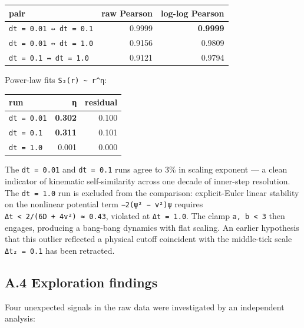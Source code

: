 \documentclass[
]{article}
\begin{document}
\begin{longtable}[]{@{}lrr@{}}
\toprule\noalign{}
pair & raw Pearson & log-log Pearson \\
\midrule\noalign{}
\endhead
\bottomrule\noalign{}
\endlastfoot
\texttt{dt\ =\ 0.01\ ↔\ dt\ =\ 0.1} & 0.9999 & \textbf{0.9999} \\
\texttt{dt\ =\ 0.01\ ↔\ dt\ =\ 1.0} & 0.9156 & 0.9809 \\
\texttt{dt\ =\ 0.1\ ↔\ dt\ =\ 1.0} & 0.9121 & 0.9794 \\
\end{longtable}

Power-law fits \texttt{S₂(r)\ \textasciitilde{}\ r\^{}η}:

\begin{longtable}[]{@{}lrr@{}}
\toprule\noalign{}
run & η & residual \\
\midrule\noalign{}
\endhead
\bottomrule\noalign{}
\endlastfoot
\texttt{dt\ =\ 0.01} & \textbf{0.302} & 0.100 \\
\texttt{dt\ =\ 0.1} & \textbf{0.311} & 0.101 \\
\texttt{dt\ =\ 1.0} & 0.001 & 0.000 \\
\end{longtable}

The \texttt{dt\ =\ 0.01} and \texttt{dt\ =\ 0.1} runs agree to 3\% in
scaling exponent --- a clean indicator of kinematic self-similarity
across one decade of inner-step resolution. The \texttt{dt\ =\ 1.0} run
is excluded from the comparison: explicit-Euler linear stability on the
nonlinear potential term \texttt{−2(\textbar{}ψ\textbar{}²\ −\ v²)ψ}
requires \texttt{Δt\ \textless{}\ 2/(6D\ +\ 4v²)\ ≈\ 0.43}, violated at
\texttt{Δt\ =\ 1.0}. The clamp
\texttt{\textbar{}a\textbar{},\ \textbar{}b\textbar{}\ \textless{}\ 3}
then engages, producing a bang-bang dynamics with flat scaling. An
earlier hypothesis that this outlier reflected a physical cutoff
coincident with the middle-tick scale \texttt{Δt₂\ =\ 0.1} has been
retracted.

\hypertarget{a.4-exploration-findings}{%
\subsection{A.4 Exploration findings}\label{a.4-exploration-findings}}

Four unexpected signals in the raw data were investigated by an
independent analysis:
\end{document}
